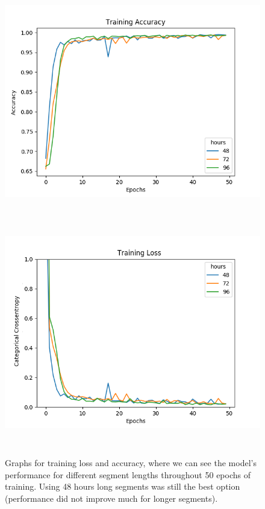 \begin{figure}
\begin{center}
      \includegraphics[height=10cm]{img/control_condition/plot_acc_train_50e.png}
      \includegraphics[height=10cm]{img/control_condition/plot_loss_train_50e.png}

      \caption{Graphs for training loss and accuracy, where we can see the model's performance for different segment lengths throughout 50 epochs of training. Using 48 hours long segments was still the best option (performance did not improve much for longer segments).}
      \label{figure:control_condition_50e_train}
\end{center}
\end{figure}

